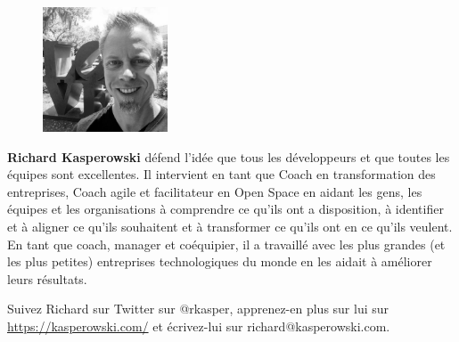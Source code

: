 \documentclass[11pt]{book}
\begin{document}
\begin{figure}
  \vspace{-2em}
  \begin{center}
    \includegraphics[width=10em]{rkasper_gs.png}
  \end{center}
  \vspace{-2em}
\end{figure}

\textbf{Richard Kasperowski} défend l'idée que tous les développeurs et que toutes les équipes sont excellentes. Il intervient
en tant que Coach en transformation des entreprises, Coach agile et facilitateur en Open Space en aidant les gens, 
les équipes et les organisations à comprendre ce qu'ils ont a disposition, à identifier et à aligner ce qu'ils souhaitent
et à transformer ce qu'ils ont en ce qu'ils veulent. En tant que coach, manager et coéquipier, il a travaillé avec les 
plus grandes (et les plus petites) entreprises technologiques du monde en les aidait à améliorer leurs résultats.

Suivez Richard sur Twitter sur @rkasper, apprenez-en plus sur lui sur \url{https://kasperowski.com/}
et écrivez-lui sur richard@kasperowski.com.
\end{document}
